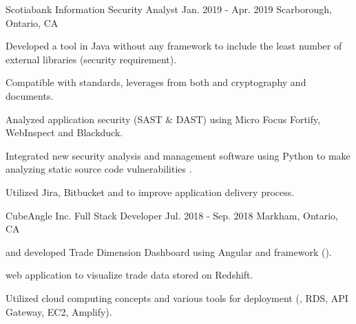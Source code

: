 \begin{cventries}
  \cventry
    {Scotiabank} %
    {Information Security Analyst} %
    {Jan. 2019 - Apr. 2019} %
    {Scarborough, Ontario, CA} %
    {
      \begin{cvitems} %
        \item {Developed a  tool in Java without any framework to include the least number of external libraries (security requirement).}
          \begin{cvsubitems}
            \item {Compatible with  standards, leverages from both  and  cryptography and  documents.}
          \end{cvsubitems}
        \item {Analyzed application security (SAST \& DAST) using Micro Focus Fortify, WebInspect and Blackduck.}
        \item {Integrated new security analysis and management software using Python to make analyzing static source code vulnerabilities .}
          \begin{cvsubitems}
            \item {Utilized Jira, Bitbucket and  to improve application delivery process.}
          \end{cvsubitems}
      \end{cvitems}
    }

  \cventry
    {CubeAngle Inc.} %
    {Full Stack Developer} %
    {Jul. 2018 - Sep. 2018} %
    {Markham, Ontario, CA} %
    {
      \begin{cvitems} %
        \item { and developed Trade Dimension Dashboard using Angular and  framework ().}
          \begin{cvsubitems}
            \item { web application to visualize trade data stored on  Redshift.}
          \end{cvsubitems}
        \item {Utilized cloud computing concepts and various  tools for deployment (, RDS, API Gateway,  EC2, Amplify).}
      \end{cvitems}
    }


\end{cventries}
